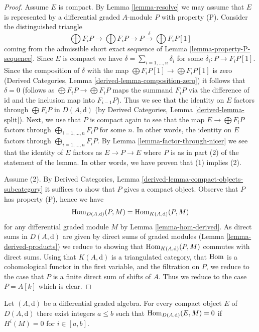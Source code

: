 \begin{proof}
Assume $E$ is compact. By Lemma \ref{lemma-resolve} we may assume that $E$
is represented by a differential graded $A$-module $P$ with property (P).
Consider the distinguished triangle
$$
\bigoplus F_iP \to \bigoplus F_iP \to P
\xrightarrow{\delta} \bigoplus F_iP[1]
$$
coming from the admissible short exact sequence of
Lemma \ref{lemma-property-P-sequence}. Since $E$ is compact we have
$\delta = \sum_{i = 1, \ldots, n} \delta_i$ for some
$\delta_i : P \to F_iP[1]$. Since the composition of $\delta$
with the map $\bigoplus F_iP[1] \to \bigoplus F_iP[1]$ is zero
(Derived Categories, Lemma \ref{derived-lemma-composition-zero})
it follows that $\delta = 0$ (follows as $\bigoplus F_iP \to \bigoplus F_iP$
maps the summand $F_iP$ via the difference of $\text{id}$ and the inclusion
map into $F_{i - 1}P$).
Thus we see that the identity on $E$ factors through
$\bigoplus F_iP$ in $D(A, \text{d})$ (by
Derived Categories, Lemma \ref{derived-lemma-split}).
Next, we use that $P$ is compact again to see that the map
$E \to \bigoplus F_iP$ factors through $\bigoplus_{i = 1, \ldots, n} F_iP$
for some $n$. In other words, the identity on $E$ factors through
$\bigoplus_{i = 1, \ldots, n} F_iP$. By
Lemma \ref{lemma-factor-through-nicer}
we see that the identity of $E$ factors as $E \to P \to E$
where $P$ is as in part (2) of the statement of the lemma.
In other words, we have proven that (1) implies (2).

\medskip\noindent
Assume (2). By
Derived Categories, Lemma \ref{derived-lemma-compact-objects-subcategory}
it suffices to show that $P$ gives a compact object. Observe that
$P$ has property (P), hence we have
$$
\mathop{\mathrm{Hom}}\nolimits_{D(A, \text{d})}(P, M) = \mathop{\mathrm{Hom}}\nolimits_{K(A, \text{d})}(P, M)
$$
for any differential graded module $M$ by Lemma \ref{lemma-hom-derived}.
As direct sums in $D(A, \text{d})$ are given by direct sums of
graded modules (Lemma \ref{lemma-derived-products}) we reduce
to showing that $\mathop{\mathrm{Hom}}\nolimits_{K(A, \text{d})}(P, M)$ commutes with direct
sums. Using that $K(A, \text{d})$ is a triangulated category,
that $\mathop{\mathrm{Hom}}\nolimits$ is a cohomological functor in the first
variable, and the filtration on $P$, we reduce to the case that
$P$ is a finite direct sum of shifts of $A$. Thus we reduce to
the case $P = A[k]$ which is clear.
\end{proof}

\begin{lemma}
\label{lemma-compact-implies-bounded}
Let $(A, \text{d})$ be a differential graded algebra.
For every compact object $E$ of $D(A, \text{d})$ there
exist integers $a \leq b$ such that $\mathop{\mathrm{Hom}}\nolimits_{D(A, \text{d})}(E, M) = 0$
if $H^i(M) = 0$ for $i \in [a, b]$.
\end{lemma}

